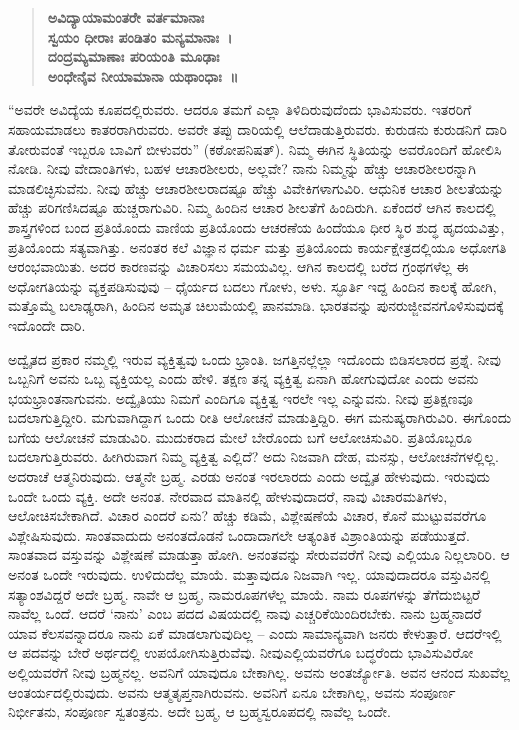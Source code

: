 \begin{verse}
\textbf{ಅವಿದ್ಯಾಯಾಮಂತರೇ ವರ್ತಮಾನಾಃ}\\\textbf{ಸ್ವಯಂ ಧೀರಾಃ ಪಂಡಿತಂ ಮನ್ಯಮಾನಾಃ~।}\\\textbf{ದಂದ್ರಮ್ಯಮಾಣಾಃ ಪರಿಯಂತಿ ಮೂಢಾಃ}\\\textbf{ಅಂಧೇನೈವ ನೀಯಾಮಾನಾ ಯಥಾಂಧಾಃ~॥}
\end{verse}

“ಅವರೇ ಅವಿದ್ಯೆಯ ಕೂಪದಲ್ಲಿರುವರು. ಆದರೂ ತಮಗೆ ಎಲ್ಲಾ ತಿಳಿದಿರುವುದೆಂದು ಭಾವಿಸುವರು. ಇತರರಿಗೆ ಸಹಾಯಮಾಡಲು ಕಾತರರಾಗಿರುವರು. ಅವರೇ ತಪ್ಪು ದಾರಿಯಲ್ಲಿ ಆಲೆದಾಡುತ್ತಿರುವರು. ಕುರುಡನು ಕುರುಡನಿಗೆ ದಾರಿ ತೋರುವಂತೆ ಇಬ್ಬರೂ ಬಾವಿಗೆ ಬೀಳುವರು” (ಕಠೋಪನಿಷತ್​). ನಿಮ್ಮ ಈಗಿನ ಸ್ಥಿತಿಯನ್ನು ಅವರೊಂದಿಗೆ ಹೋಲಿಸಿ ನೋಡಿ. ನೀವು ವೇದಾಂತಿಗಳು, ಬಹಳ ಆಚಾರಶೀಲರು, ಅಲ್ಲವೇ? ನಾನು ನಿಮ್ಮನ್ನು ಹೆಚ್ಚು ಆಚಾರಶೀಲರನ್ನಾಗಿ ಮಾಡಲಿಚ್ಛಿಸುವೆನು. ನೀವು ಹೆಚ್ಚು ಆಚಾರಶೀಲರಾದಷ್ಟೂ ಹೆಚ್ಚು ವಿವೇಕಿಗಳಾಗುವಿರಿ. ಆಧುನಿಕ ಆಚಾರ ಶೀಲತೆಯನ್ನು ಹೆಚ್ಚು ಪರಿಗಣಿಸಿದಷ್ಟೂ ಹುಚ್ಚರಾಗುವಿರಿ. ನಿಮ್ಮ ಹಿಂದಿನ ಆಚಾರ ಶೀಲತೆಗೆ ಹಿಂದಿರುಗಿ. ಏಕೆಂದರೆ ಆಗಿನ ಕಾಲದಲ್ಲಿ ಶಾಸ್ತ್ರಗಳಿಂದ ಬಂದ ಪ್ರತಿಯೊಂದು ವಾಣಿಯ ಪ್ರತಿಯೊಂದು ಆಚರಣೆಯ ಹಿಂದೆಯೂ ಧೀರ ಸ್ಥಿರ ಶುದ್ಧ ಹೃದಯವಿತ್ತು, ಪ್ರತಿಯೊಂದು ಸತ್ಯವಾಗಿತ್ತು. ಅನಂತರ ಕಲೆ ವಿಜ್ಞಾನ ಧರ್ಮ ಮತ್ತು ಪ್ರತಿಯೊಂದು ಕಾರ್ಯಕ್ಷೇತ್ರದಲ್ಲಿಯೂ ಅಧೋಗತಿ ಆರಂಭವಾಯಿತು. ಅದರ ಕಾರಣವನ್ನು ವಿಚಾರಿಸಲು ಸಮಯವಿಲ್ಲ. ಆಗಿನ ಕಾಲದಲ್ಲಿ ಬರೆದ ಗ್ರಂಥಗಳೆಲ್ಲ ಈ ಅಧೋಗತಿಯನ್ನು ವ್ಯಕ್ತಪಡಿಸುವುವು – ಧೈರ್ಯದ ಬದಲು ಗೋಳು, ಅಳು. ಸ್ಫೂರ್ತಿ ಇದ್ದ ಹಿಂದಿನ ಕಾಲಕ್ಕೆ ಹೋಗಿ, ಮತ್ತೊಮ್ಮೆ ಬಲಾಢ್ಯರಾಗಿ, ಹಿಂದಿನ ಅಮೃತ ಚಿಲುಮೆಯಲ್ಲಿ ಪಾನಮಾಡಿ. ಭಾರತವನ್ನು ಪುನರುಜ್ಜೀವನಗೊಳಿಸುವುದಕ್ಕೆ ಇದೊಂದೇ ದಾರಿ.

ಅದ್ವೈತದ ಪ್ರಕಾರ ನಮ್ಮಲ್ಲಿ ಇರುವ ವ್ಯಕ್ತಿತ್ವವು ಒಂದು ಭ್ರಾಂತಿ. ಜಗತ್ತಿನಲ್ಲೆಲ್ಲಾ ಇದೊಂದು ಬಿಡಿಸಲಾರದ ಪ್ರಶ್ನೆ. ನೀವು ಒಬ್ಬನಿಗೆ ಅವನು ಒಬ್ಬ ವ್ಯಕ್ತಿಯಲ್ಲ ಎಂದು ಹೇಳಿ. ತಕ್ಷಣ ತನ್ನ ವ್ಯಕ್ತಿತ್ವ ಏನಾಗಿ ಹೋಗುವುದೋ ಎಂದು ಅವನು ಭಯಭ್ರಾಂತನಾಗುವನು. ಅದ್ವೈತಿಯು ನಿಮಗೆ ಎಂದಿಗೂ ವ್ಯಕ್ತಿತ್ವ ಇರಲೇ ಇಲ್ಲ ಎನ್ನುವನು. ನೀವು ಪ್ರತಿಕ್ಷಣವೂ ಬದಲಾಗುತ್ತಿದ್ದೀರಿ. ಮಗುವಾಗಿದ್ದಾಗ ಒಂದು ರೀತಿ ಆಲೋಚನೆ ಮಾಡುತ್ತಿದ್ದಿರಿ. ಈಗ ಮನುಷ್ಯರಾಗಿರುವಿರಿ. ಈಗೊಂದು ಬಗೆಯ ಆಲೋಚನೆ ಮಾಡುವಿರಿ. ಮುದುಕರಾದ ಮೇಲೆ ಬೇರೊಂದು ಬಗೆ ಆಲೋಚಿಸುವಿರಿ. ಪ್ರತಿಯೊಬ್ಬರೂ ಬದಲಾಗುತ್ತಿರುವರು. ಹೀಗಿರುವಾಗ ನಿಮ್ಮ ವ್ಯಕ್ತಿತ್ವ ಎಲ್ಲಿದೆ? ಅದು ನಿಜವಾಗಿ ದೇಹ, ಮನಸ್ಸು, ಆಲೋಚನೆಗಳಲ್ಲಿಲ್ಲ. ಅದರಾಚೆ ಆತ್ಮನಿರುವುದು. ಆತ್ಮನೇ ಬ್ರಹ್ಮ. ಎರಡು ಅನಂತ ಇರಲಾರದು ಎಂದು ಅದ್ವೈತ ಹೇಳುವುದು. ಇರುವುದು ಒಂದೇ ಒಂದು ವ್ಯಕ್ತಿ. ಅದೇ ಅನಂತ. ನೇರವಾದ ಮಾತಿನಲ್ಲಿ ಹೇಳುವುದಾದರೆ, ನಾವು ವಿಚಾರಮತಿಗಳು, ಆಲೋಚಿಸಬೇಕಾಗಿದೆ. ವಿಚಾರ ಎಂದರೆ ಏನು? ಹೆಚ್ಚು ಕಡಿಮೆ, ವಿಶ್ಲೇಷಣೆಯೆ ವಿಚಾರ, ಕೊನೆ ಮುಟ್ಟುವವರೆಗೂ ವಿಶ್ಲೇಷಿಸುವುದು. ಸಾಂತವಾದುದು ಅನಂತದೊಡನೆ ಒಂದಾದಾಗಲೇ ಆತ್ಯಂತಿಕ ವಿಶ್ರಾಂತಿಯನ್ನು ಪಡೆಯುತ್ತದೆ. ಸಾಂತವಾದ ವಸ್ತುವನ್ನು ವಿಶ್ಲೇಷಣೆ ಮಾಡುತ್ತಾ ಹೋಗಿ. ಅನಂತವನ್ನು ಸೇರುವವರೆಗೆ ನೀವು ಎಲ್ಲಿಯೂ ನಿಲ್ಲಲಾರಿರಿ. ಆ ಅನಂತ ಒಂದೇ ಇರುವುದು. ಉಳಿದುದೆಲ್ಲ ಮಾಯೆ. ಮತ್ತಾವುದೂ ನಿಜವಾಗಿ ಇಲ್ಲ. ಯಾವುದಾದರೂ ವಸ್ತುವಿನಲ್ಲಿ ಸತ್ಯಾಂಶವಿದ್ದರೆ ಅದೇ ಬ್ರಹ್ಮ. ನಾವೇ ಆ ಬ್ರಹ್ಮ, ನಾಮರೂಪಗಳೆಲ್ಲ ಮಾಯೆ. ನಾಮ ರೂಪಗಳನ್ನು ತೆಗೆದುಬಿಟ್ಟರೆ ನಾವೆಲ್ಲ ಒಂದೆ. ಆದರೆ ‘ನಾನು’ ಎಂಬ ಪದದ ವಿಷಯದಲ್ಲಿ ನಾವು ಎಚ್ಚರಿಕೆಯಿಂದಿರಬೇಕು. ನಾನು ಬ್ರಹ್ಮನಾದರೆ ಯಾವ ಕೆಲಸವನ್ನಾದರೂ ನಾನು ಏಕೆ ಮಾಡಲಾಗುವುದಿಲ್ಲ – ಎಂದು ಸಾಮಾನ್ಯವಾಗಿ ಜನರು ಕೇಳುತ್ತಾರೆ. ಆದರೆ\break ಇಲ್ಲಿ ಆ ಪದವನ್ನು ಬೇರೆ ಅರ್ಥದಲ್ಲಿ ಉಪಯೋಗಿಸುತ್ತಿರುವೆವು. ನೀವು\break ಎಲ್ಲಿಯವರೆಗೂ ಬದ್ಧರೆಂದು ಭಾವಿಸುವಿರೋ ಅಲ್ಲಿಯವರೆಗೆ ನೀವು ಬ್ರಹ್ಮನಲ್ಲ. ಅವನಿಗೆ ಯಾವುದೂ ಬೇಕಾಗಿಲ್ಲ. ಅವನು ಅಂತರ್ಜ್ಯೋತಿ. ಅವನ ಆನಂದ ಸುಖವೆಲ್ಲ ಆಂತರ್ಯದಲ್ಲಿರುವುದು. ಅವನು ಆತ್ಮತೃಪ್ತನಾಗಿರುವನು. ಅವನಿಗೆ ಏನೂ ಬೇಕಾಗಿಲ್ಲ, ಅವನು ಸಂಪೂರ್ಣ ನಿರ್ಭೀತನು, ಸಂಪೂರ್ಣ ಸ್ವತಂತ್ರನು. ಅದೇ ಬ್ರಹ್ಮ, ಆ ಬ್ರಹ್ಮಸ್ವರೂಪದಲ್ಲಿ ನಾವೆಲ್ಲ ಒಂದೇ.

